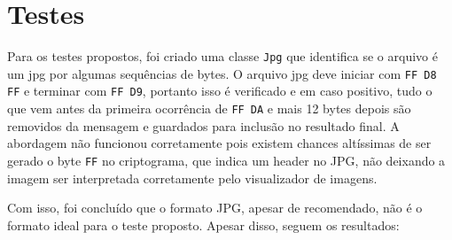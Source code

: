 \documentclass[12pt]{article}
\begin{document}
\section{Testes}
Para os testes propostos, foi criado uma classe \texttt{Jpg} que identifica se o arquivo é um jpg por algumas sequências de bytes. O arquivo jpg deve iniciar com \texttt{FF D8 FF} e terminar com \texttt{FF D9}, portanto isso é verificado e em caso positivo, tudo o que vem antes da primeira ocorrência de \texttt{FF DA} e mais 12 bytes depois são removidos da mensagem e guardados para inclusão no resultado final. A abordagem não funcionou corretamente pois existem chances altíssimas de ser gerado o byte \texttt{FF} no criptograma, que indica um header no JPG, não deixando a imagem ser interpretada corretamente pelo visualizador de imagens.

Com isso, foi concluído que o formato JPG, apesar de recomendado, não é o formato ideal para o teste proposto. Apesar disso, seguem os resultados:
\end{document}
